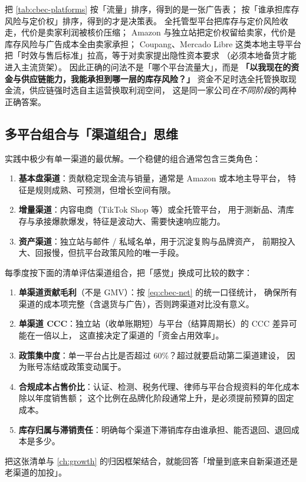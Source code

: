 \begin{insight}
把 \cref{tab:cbec-platforms} 按「流量」排序，得到的是一张广告表；
按「谁承担库存风险与定价权」排序，得到的才是决策表。
全托管型平台把库存与定价风险收走，代价是卖家利润被核价压缩；
Amazon 与独立站把定价权留给卖家，代价是库存风险与广告成本全由卖家承担；
Coupang、Mercado Libre 这类本地主导平台把「时效与售后标准」拉高，等于对卖家提出隐性资本要求
（必须本地备货才能进入主流货架）。
因此正确的问法不是「哪个平台流量大」，而是
\textbf{「以我现在的资金与供应链能力，我能承担到哪一层的库存风险？」}
资金不足时选全托管换取现金流，供应链强时选自主运营换取利润空间，
这是同一家公司\emph{在不同阶段}的两种正确答案。
\end{insight}

\subsection{多平台组合与「渠道组合」思维}

实践中极少有单一渠道的最优解。一个稳健的组合通常包含三类角色：

\begin{enumerate}
  \item \textbf{基本盘渠道}：贡献稳定现金流与销量，通常是 Amazon 或本地主导平台，
        特征是规则成熟、可预测，但增长空间有限。
  \item \textbf{增量渠道}：内容电商（TikTok Shop 等）或全托管平台，
        用于测新品、清库存与承接爆款爆发，特征是波动大、需要快速响应能力。
  \item \textbf{资产渠道}：独立站与邮件 / 私域名单，用于沉淀复购与品牌资产，
        前期投入大、回报慢，但抗平台政策风险的唯一手段。
\end{enumerate}

\begin{toolbox}[渠道组合的季度复盘清单]
每季度按下面的清单评估渠道组合，把「感觉」换成可比较的数字：
\begin{enumerate}
  \item \textbf{单渠道贡献毛利}（不是 GMV）：按 \cref{eq:cbec-net} 的统一口径统计，
        确保所有渠道的成本项完整（含退货与广告），否则跨渠道对比没有意义。
  \item \textbf{单渠道 CCC}：独立站（收单账期短）与平台（结算周期长）的 CCC 差异可能在一倍以上，
        这直接决定了渠道的「资金占用效率」。
  \item \textbf{政策集中度}：单一平台占比是否超过 60\%？超过就要启动第二渠道建设，
        因为账号冻结或政策变动属于。
  \item \textbf{合规成本占售价比}：认证、检测、税务代理、律师与平台合规资料的年化成本除以年度销售额；
        这个比例在品牌化阶段通常上升，是必须提前预算的固定成本。
  \item \textbf{库存归属与滞销责任}：明确每个渠道下滞销库存由谁承担、能否退回、退回成本是多少。
\end{enumerate}
把这张清单与 \cref{ch:growth} 的归因框架结合，就能回答「增量到底来自新渠道还是老渠道的加投」。
\end{toolbox}

